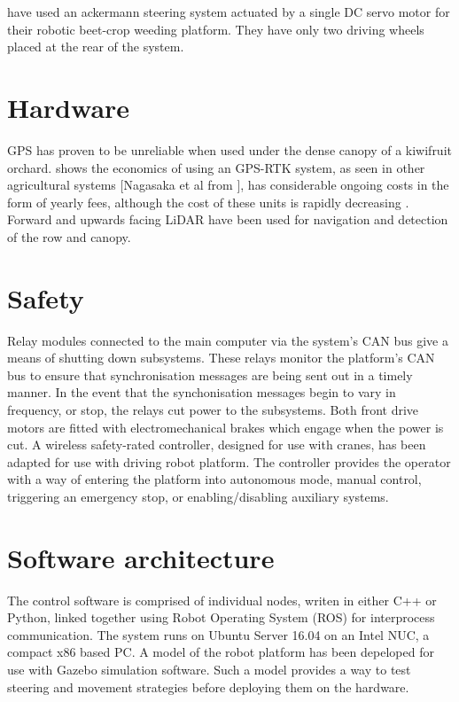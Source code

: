 \documentclass[preprint,authoryear,12pt]{elsarticle}
\begin{document}
\citep{Astrand2002} have used an ackermann steering system actuated by a single DC servo motor for their robotic beet-crop weeding platform. They have only two driving wheels placed at the rear of the system.


\section{Hardware}
\label{sect:hardware}
GPS has proven to be unreliable when used under the dense canopy of a kiwifruit orchard.
\citep{Pedersen2006} shows the economics of using an GPS-RTK system, as seen in other agricultural systems \citep{Bak2004,Ruckelshausen2009}[Nagasaka et al from \citep{Torii2000}], has considerable ongoing costs in the form of yearly fees, although the cost of these units is rapidly decreasing \citep{Torii2000}.
Forward and upwards facing LiDAR have been used for navigation and detection of the row and canopy.

\section{Safety}
Relay modules connected to the main computer via the system's CAN bus give a means of shutting down subsystems.
These relays monitor the platform's CAN bus to ensure that synchronisation messages are being sent out in a timely manner.
In the event that the synchonisation messages begin to vary in frequency, or stop, the relays cut power to the subsystems.
Both front drive motors are fitted with electromechanical brakes which engage when the power is cut.
A wireless safety-rated controller, designed for use with cranes, has been adapted for use with driving robot platform.
The controller provides the operator with a way of entering the platform into autonomous mode, manual control, triggering an emergency stop, or enabling/disabling auxiliary systems.

\section{Software architecture}
\label{sect:software}
The control software is comprised of individual nodes, writen in either C++ or Python, linked together using Robot Operating System (ROS) for interprocess communication.
The system runs on Ubuntu Server 16.04 on an Intel NUC, a compact x86 based PC.
A model of the robot platform has been depeloped for use with Gazebo simulation software.
Such a model provides a way to test steering and movement strategies before deploying them on the hardware.
\end{document}
